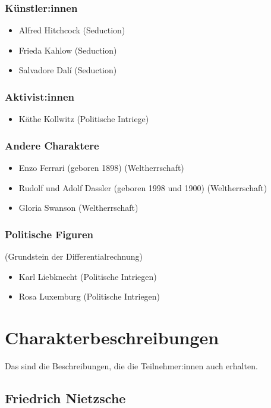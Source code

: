 \documentclass[12pt, a4paper, openany]{report}
\begin{document}
\subsubsection{Künstler:innen}
\begin{itemize}
	\item Alfred Hitchcock (Seduction)
	\item Frieda Kahlow (Seduction)
	\item Salvadore Dalí (Seduction)
\end{itemize}

\subsubsection{Aktivist:innen}
\begin{itemize}
	\item Käthe Kollwitz (Politische Intriege)
\end{itemize}

\subsubsection{Andere Charaktere}
\begin{itemize}
	\item Enzo Ferrari (geboren 1898) (Weltherrschaft)
	\item Rudolf und Adolf Dassler (geboren 1998 und 1900) (Weltherrschaft)
	\item Gloria Swanson (Weltherrschaft)
\end{itemize}

\subsubsection{Politische Figuren}(Grundstein der Differentialrechnung)
\begin{itemize}
	\item Karl Liebknecht (Politische Intriegen)
	\item Rosa Luxemburg (Politische Intriegen)
\end{itemize}

\section{Charakterbeschreibungen}
Das sind die Beschreibungen, die die Teilnehmer:innen auch erhalten.

\subsection{Friedrich Nietzsche}
\end{document}
